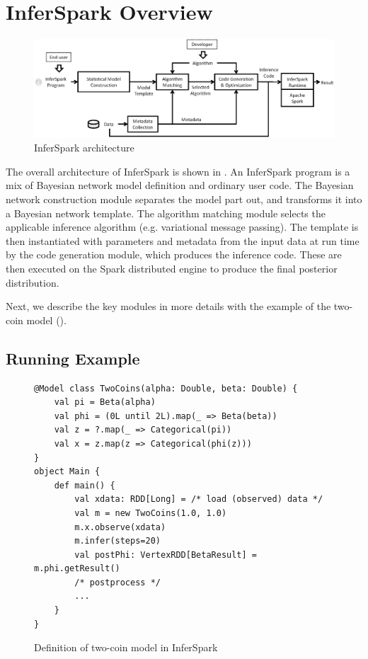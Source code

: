 \chapter{InferSpark Overview}
\label{chap:framework}
\begin{figure}[!ht]
	\centering
    \includegraphics[width=0.9\linewidth, clip]{figs/workflow_future.eps}
    \caption{InferSpark architecture}
    \label{fig:workflow}
\end{figure}

The overall architecture of InferSpark is shown in .  An
InferSpark program is a mix of Bayesian network model definition and ordinary 
user code. The Bayesian network construction module separates the model part
out, and transforms it into a Bayesian network template. The algorithm
matching module selects the applicable inference algorithm (e.g. variational
message passing). The template is
then instantiated with parameters and metadata from the input data at run time
by the code generation module, which produces the inference code. These are
then executed on the Spark distributed engine to produce the final posterior
distribution.

Next, we describe the key modules in more details with the example of the
two-coin model (). 

\section{Running Example}

\begin{figure}[h]
\begin{lstlisting}
@Model class TwoCoins(alpha: Double, beta: Double) {
	val pi = Beta(alpha)
	val phi = (0L until 2L).map(_ => Beta(beta))
	val z = ?.map(_ => Categorical(pi))
	val x = z.map(z => Categorical(phi(z)))
}
object Main {
	def main() {
		val xdata: RDD[Long] = /* load (observed) data */
		val m = new TwoCoins(1.0, 1.0)
		m.x.observe(xdata)
		m.infer(steps=20)
		val postPhi: VertexRDD[BetaResult] = m.phi.getResult()
		/* postprocess */
		...
	}
}
\end{lstlisting}
\caption{Definition of two-coin model in InferSpark}
\label{fig:two_coins_modeldef}
\centering
\end{figure}

